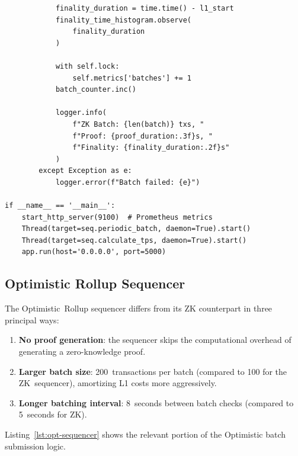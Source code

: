 \documentclass[
]{elteikthesis}[2024/04/26]
\begin{document}
\begin{listing}[H]
\begin{verbatim}
            finality_duration = time.time() - l1_start
            finality_time_histogram.observe(
                finality_duration
            )
            
            with self.lock:
                self.metrics['batches'] += 1
            batch_counter.inc()
            
            logger.info(
                f"ZK Batch: {len(batch)} txs, "
                f"Proof: {proof_duration:.3f}s, "
                f"Finality: {finality_duration:.2f}s"
            )
        except Exception as e:
            logger.error(f"Batch failed: {e}")

if __name__ == '__main__':
    start_http_server(9100)  # Prometheus metrics
    Thread(target=seq.periodic_batch, daemon=True).start()
    Thread(target=seq.calculate_tps, daemon=True).start()
    app.run(host='0.0.0.0', port=5000)
    \end{verbatim}
    \caption{ZK Rollup sequencer - Python implementation}
    \label{lst:zk-sequencer}
\end{listing}

\subsection{Optimistic Rollup Sequencer}

The Optimistic~Rollup sequencer differs from its ZK counterpart in three principal ways:
\begin{enumerate}
    \item \textbf{No proof generation}: the sequencer skips the computational overhead of generating a zero-knowledge proof.
    \item \textbf{Larger batch size}: 200~transactions per batch (compared to 100 for the ZK~sequencer), amortizing L1 costs more aggressively.
    \item \textbf{Longer batching interval}: 8~seconds between batch checks (compared to 5~seconds for ZK).
\end{enumerate}

Listing~\ref{lst:opt-sequencer} shows the relevant portion of the Optimistic batch submission logic.
\end{document}
